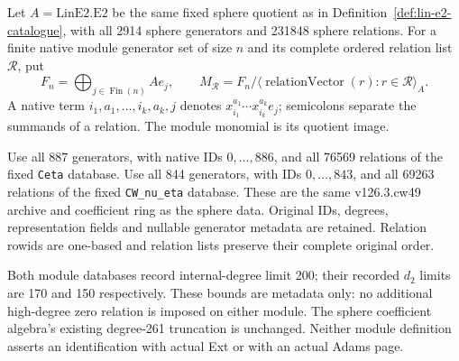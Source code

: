 \begin{definition}
  \label{def:lin-native-module-presentations}
  \leanok
  Let $A=\mathrm{LinE2.E2}$ be the same fixed sphere quotient as in
  Definition~\ref{def:lin-e2-catalogue}, with all 2914 sphere generators
  and 231848 sphere relations. For a finite native module generator set
  of size $n$ and its complete ordered relation list $\mathcal R$, put
  \[
    F_n=\bigoplus_{j\in\operatorname{Fin}(n)}A e_j,
    \qquad
    M_{\mathcal R}=F_n/
      \langle\operatorname{relationVector}(r):r\in\mathcal R\rangle_A.
  \]
  A native term $i_1,a_1,\ldots,i_k,a_k,j$ denotes
  $x_{i_1}^{a_1}\cdots x_{i_k}^{a_k}e_j$; semicolons separate the
  summands of a relation. The module monomial is its quotient image.

  Use all 887 generators, with native IDs $0,\ldots,886$, and all
  76569 relations of the fixed \texttt{Ceta} database. Use all 844
  generators, with IDs $0,\ldots,843$, and all 69263 relations of the
  fixed \texttt{CW\_nu\_eta} database. These are the same
  v126.3.cw49 archive and coefficient ring as the sphere data.
  Original IDs, degrees, representation fields and nullable generator
  metadata are retained. Relation rowids are one-based and relation
  lists preserve their complete original order.

  Both module databases record internal-degree limit 200; their
  recorded $d_2$ limits are 170 and 150 respectively. These bounds
  are metadata only: no additional high-degree zero relation is imposed
  on either module. The sphere coefficient algebra's existing degree-261
  truncation is unchanged. Neither module definition asserts an
  identification with actual Ext or with an actual Adams page.
\end{definition}


